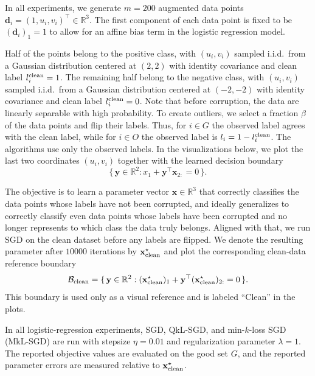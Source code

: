 \documentclass[11pt]{article}
\newcommand{\ve}[1]{\mathbf{#1}}
\begin{document}
In all experiments, we generate $m=200$ augmented data points $\ve d_i=(1,u_i,v_i)^\top\in\mathbb R^3$. The first component of each data point is fixed to be $(\ve{d}_i)_1 = 1$ to allow for an affine bias term in the logistic regression model.

Half of the points belong to the positive class, with $(u_i,v_i)$ sampled i.i.d.\ from a Gaussian distribution centered at $(2,2)$ with identity covariance and clean label $l_i^{\rm clean}=1$. The remaining half belong to the negative class, with $(u_i,v_i)$ sampled i.i.d.\ from a Gaussian distribution centered at $(-2,-2)$ with identity covariance and clean label $l_i^{\rm clean}=0$. Note that before corruption, the data are linearly separable with high probability. To create outliers, we select a fraction $\beta$ of the data points and flip their labels. Thus, for $i\in G$ the observed label agrees with the clean label, while for $i\in O$ the observed label is $l_i=1-l_i^{\rm clean}$. The algorithms use only the observed labels. In the visualizations below, we plot the last two coordinates $(u_i,v_i)$ together with the learned decision boundary
\[
\{\,\ve y\in\mathbb R^2: x_1+\ve y^\top \ve x_{2:}=0\,\}.
\]

The objective is to learn a parameter vector $\mathbf{x} \in \mathbb{R}^3$ that correctly classifies the data points whose labels have not been corrupted, and ideally generalizes to correctly classify even data points whose labels have been corrupted and no longer represents to which class the data truly belongs.
Aligned with that, we run SGD on the
clean dataset before any labels are flipped. We denote the resulting parameter
after $10000$ iterations by $\ve{x}^\star_{\rm clean}$ and plot the
corresponding clean-data reference boundary
\[
\mathcal B_{\rm clean}
=
\{\,\ve y\in \mathbb R^2 :
(\ve{x}^\star_{\rm clean})_1
+
\ve y^\top(\ve{x}^\star_{\rm clean})_{2:}=0
\,\}.
\]
This boundary is used only as a visual reference and is labeled
``Clean'' in the plots.

In all logistic-regression experiments, SGD, QkL-SGD, and min-$k$-loss SGD (MkL-SGD) are run with stepsize $\eta=0.01$ and regularization parameter $\lambda=1$. The reported objective values are evaluated on the good set $G$, and the reported parameter errors are measured relative to $\ve x^\star_{\rm clean}$.
\end{document}
